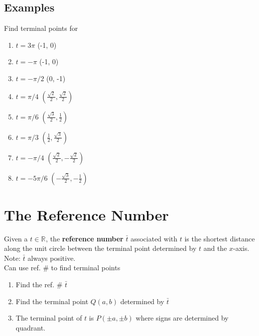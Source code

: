 \documentclass{tufte-handout}
\newcommand{\R}[1]{\mathbb{R}^{#1}}
\begin{document}
\subsection{Examples}
Find terminal points for 
\begin{enumerate}
\item $t = 3\pi$ {\color{blue} (-1, 0)}
\item $t = -\pi$ {\color{blue} (-1, 0)}
\item $t = -\pi/2$ {\color{blue} (0, -1)}
\item $t = \pi/4$ {\color{blue} $(\frac{\sqrt{2}}{2}, \frac{\sqrt{2}}{2})$}
\item $t = \pi/6$ {\color{blue} $(\frac{\sqrt{3}}{2}, \frac{1}{2})$}
\item $t = \pi/3$ {\color{blue} $(\frac{1}{2}, \frac{\sqrt{3}}{2})$}
\item $t = -\pi/4$ {\color{blue} $(\frac{\sqrt{2}}{2}, -\frac{\sqrt{2}}{2})$}
\item $t = -5\pi/6$ {\color{blue} $(-\frac{\sqrt{3}}{2}, -\frac{1}{2})$}
\end{enumerate}

\section{The Reference Number}
Given a $t \in \R{}$, the \textbf{reference number} $\bar{t}$ associated with $t$ is the shortest distance along the unit circle between the terminal point determined by $t$ and the $x$-axis.
Note: $\bar{t}$ always positive. \\
Can use ref. \# to find terminal points
\begin{enumerate}
\item Find the ref. \# $\bar{t}$ 
\item Find the terminal point $Q(a, b)$ determined by $\bar{t}$
\item The terminal point of $t$ is $P(\pm a, \pm b)$ where signs are determined by quadrant.
\end{enumerate}
\end{document}
